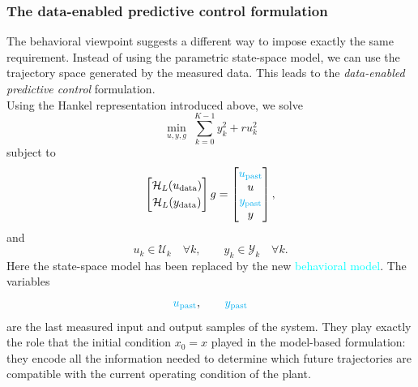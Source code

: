 \subsubsection{The data-enabled predictive control formulation}
The behavioral viewpoint suggests a different way to impose exactly the same requirement. Instead of using the parametric state-space model, we can use the trajectory space generated by the measured data. This leads to the \emph{data-enabled predictive control} formulation.\\
Using the Hankel representation introduced above, we solve
\[
\min_{u,y,g}\;\sum_{k=0}^{K-1} y_k^2 + r u_k^2
\]
subject to
\[
\begin{bmatrix}
\mathcal{H}_L(u_{\mathrm{data}})\\[1mm]
\mathcal{H}_L(y_{\mathrm{data}})
\end{bmatrix}g
=
\begin{bmatrix}
\textcolor{cyan}{u_{\mathrm{past}}}\\
u\\
\textcolor{cyan}{y_{\mathrm{past}}}\\
y
\end{bmatrix},
\]
and
\[
u_k\in\mathcal{U}_k \quad \forall k,
\qquad
y_k\in\mathcal{Y}_k \quad \forall k.
\]
Here the state-space model has been replaced by the new \textcolor{cyan}{behavioral model}. The variables
\[
\textcolor{cyan}{u_{\mathrm{past}}},\qquad \textcolor{cyan}{y_{\mathrm{past}}}
\]
are the last measured input and output samples of the system. They play exactly the role that the initial condition \(x_0=x\) played in the model-based formulation: they encode all the information needed to determine which future trajectories are compatible with the current operating condition of the plant.\\

